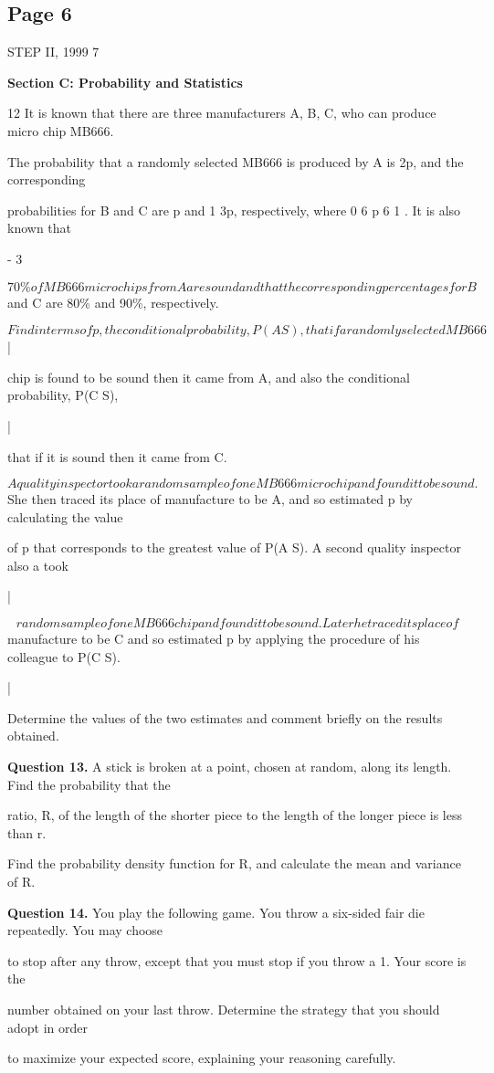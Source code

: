 \documentclass[12pt]{article}
\begin{document}
\subsection*{Page 6}
\begin{flushleft}
STEP II, 1999 7\par
\bigskip\textbf{Section C: Probability and Statistics}\par
12 It is known that there are three manufacturers A, B, C, who can produce micro chip MB666.\par
The probability that a randomly selected MB666 is produced by A is 2p, and the corresponding\par
probabilities for B and C are p and 1 3p, respectively, where 0 6 p 6 1 . It is also known that\par
- 3\par
\[70\% of MB666 micro chips from A are sound and that the corresponding percentages for B\]
and C are 80\% and 90\%, respectively.\par
\[Find in terms of p, the conditional probability, P(A S), that if a randomly selected MB666\]
|\par
chip is found to be sound then it came from A, and also the conditional probability, P(C S),\par
|\par
that if it is sound then it came from C.\par
\[A quality inspector took a random sample of one MB666 micro chip and found it to be sound.\]
She then traced its place of manufacture to be A, and so estimated p by calculating the value\par
of p that corresponds to the greatest value of P(A S). A second quality inspector also a took\par
|\par
\[random sample of one MB666 chip and found it to be sound. Later he traced its place of\]
manufacture to be C and so estimated p by applying the procedure of his colleague to P(C S).\par
|\par
Determine the values of the two estimates and comment briefly on the results obtained.\par
\bigskip\textbf{Question 13.} A stick is broken at a point, chosen at random, along its length. Find the probability that the\par
ratio, R, of the length of the shorter piece to the length of the longer piece is less than r.\par
Find the probability density function for R, and calculate the mean and variance of R.\par
\bigskip\textbf{Question 14.} You play the following game. You throw a six-sided fair die repeatedly. You may choose\par
to stop after any throw, except that you must stop if you throw a 1. Your score is the\par
number obtained on your last throw. Determine the strategy that you should adopt in order\par
to maximize your expected score, explaining your reasoning carefully.\par
\end{flushleft}
\end{document}
